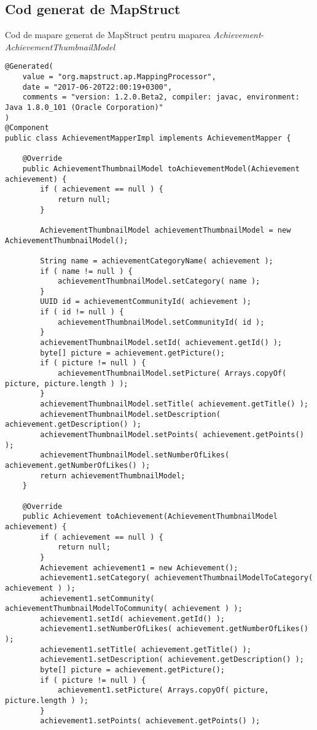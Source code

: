 \subsection{Cod generat de MapStruct}
Cod de mapare generat de MapStruct pentru maparea \textit{Achievement}-\textit{AchievementThumbnailModel}  
\begin {lstlisting}
@Generated(
    value = "org.mapstruct.ap.MappingProcessor",
    date = "2017-06-20T22:00:19+0300",
    comments = "version: 1.2.0.Beta2, compiler: javac, environment: Java 1.8.0_101 (Oracle Corporation)"
)
@Component
public class AchievementMapperImpl implements AchievementMapper {

    @Override
    public AchievementThumbnailModel toAchievementModel(Achievement achievement) {
        if ( achievement == null ) {
            return null;
        }

        AchievementThumbnailModel achievementThumbnailModel = new AchievementThumbnailModel();

        String name = achievementCategoryName( achievement );
        if ( name != null ) {
            achievementThumbnailModel.setCategory( name );
        }
        UUID id = achievementCommunityId( achievement );
        if ( id != null ) {
            achievementThumbnailModel.setCommunityId( id );
        }
        achievementThumbnailModel.setId( achievement.getId() );
        byte[] picture = achievement.getPicture();
        if ( picture != null ) {
            achievementThumbnailModel.setPicture( Arrays.copyOf( picture, picture.length ) );
        }
        achievementThumbnailModel.setTitle( achievement.getTitle() );
        achievementThumbnailModel.setDescription( achievement.getDescription() );
        achievementThumbnailModel.setPoints( achievement.getPoints() );
        achievementThumbnailModel.setNumberOfLikes( achievement.getNumberOfLikes() );
        return achievementThumbnailModel;
    }

    @Override
    public Achievement toAchievement(AchievementThumbnailModel achievement) {
        if ( achievement == null ) {
            return null;
        }
        Achievement achievement1 = new Achievement();
        achievement1.setCategory( achievementThumbnailModelToCategory( achievement ) );
        achievement1.setCommunity( achievementThumbnailModelToCommunity( achievement ) );
        achievement1.setId( achievement.getId() );
        achievement1.setNumberOfLikes( achievement.getNumberOfLikes() );
        achievement1.setTitle( achievement.getTitle() );
        achievement1.setDescription( achievement.getDescription() );
        byte[] picture = achievement.getPicture();
        if ( picture != null ) {
            achievement1.setPicture( Arrays.copyOf( picture, picture.length ) );
        }
        achievement1.setPoints( achievement.getPoints() );


\end{lstlisting}
